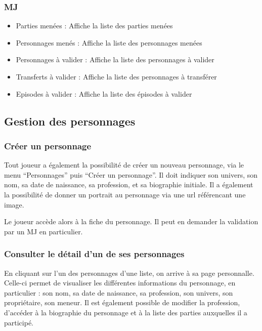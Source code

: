 \documentclass[a4paper, 11pt, titlepage]{article}
\begin{document}
\subsubsection {MJ}

\begin{itemize}
\item
Parties menées : Affiche la liste des parties menées

\item
Personnages menés : Affiche la liste des personnages menées

\item
Personnages à valider : Affiche la liste des personnages à valider

\item
Transferts à valider : Affiche la liste des personnages à transférer

\item
Episodes à valider : Affiche la liste des épisodes à valider

\end{itemize}


\subsection {Gestion des personnages}

\subsubsection {Créer un personnage}

Tout joueur a également la possibilité de créer un nouveau personnage, via le menu “Personnages” puis “Créer un personnage”. Il doit indiquer son univers, son nom, sa date de naissance, sa profession, et sa biographie initiale. Il a également la possibilité de donner un portrait au personnage via une url référencant une image.

Le joueur accède alors à la fiche du personnage. Il peut en demander la validation par un MJ en particulier.

\subsubsection {Consulter le détail d'un de ses personnages}

En cliquant sur l'un des personnages d'une liste, on arrive à sa page personnalle. Celle-ci permet de visualiser les différentes informations du personnage, en particulier : son nom, sa date de naissance, sa profession, son univers, son propriétaire, son meneur.
Il est également possible de modifier la profession, d'accéder à la biographie du personnage et à la liste des parties auxquelles il a participé.
\end{document}

